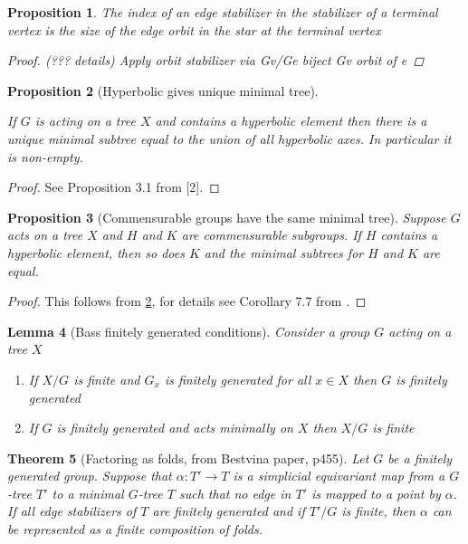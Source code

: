 \documentclass[12pt,parskip=full]{report}
\theoremstyle{plain}
\newtheorem{thm}{Theorem}[section]
\newtheorem{lem}[thm]{Lemma}
\newtheorem{prop}[thm]{Proposition}
\theoremstyle{definition}
\begin{document}
\begin{prop} The index of an edge stabilizer in the stabilizer of a terminal vertex is the size of the edge orbit in the star at the terminal vertex
\begin{proof}
    (??? details) Apply orbit stabilizer via Gv/Ge biject Gv orbit of e
\end{proof}
\end{prop}

\begin{prop}
    [Hyperbolic gives unique minimal tree]
    \label{pro:uniquemintree}
    
    If $G$ is acting on a tree $X$ and contains a hyperbolic element then there is a unique minimal subtree equal to the union of all hyperbolic axes. In particular it is non-empty.
\end{prop}
\begin{proof}
See Proposition 3.1 from [2].
\end{proof}
\begin{prop}
    [Commensurable groups have the same minimal tree]
    \label{pro:commintree}
    Suppose $G$ acts on a tree $X$ and $H$ and $K$ are commensurable subgroups. If $H$ contains a hyperbolic element, then so does $K$ and the minimal subtrees for $H$ and $K$ are equal.
\end{prop}
\begin{proof}
    This follows from \ref{pro:uniquemintree}, for details see Corollary 7.7 from \cite{hymanbass}.
\end{proof}

\begin{lem}
    [Bass finitely generated conditions]
    \label{lem:bassfgcon}
    Consider a group \(G\) acting on a tree \(X\)
    \begin{enumerate}
        \item If \(X/G\) is finite and \(G_x\) is finitely generated for all \(x\in X\) then \(G\) is finitely generated
        \item If \(G\) is finitely generated and acts minimally on \(X\) then \(X/G\) is finite
    \end{enumerate}
\end{lem}


\begin{thm}[Factoring as folds, from Bestvina paper, p455]
    \label{thm:folds} 
    Let $G$ be a finitely generated group. Suppose that $\alpha: T'\to T$ is a simplicial equivariant map from a $G$-tree $T'$ to a minimal $G$-tree $T$ such that no edge in $T'$ is mapped to a point by $\alpha$. If all edge stabilizers of $T$ are finitely generated and if $T'/G$ is finite, then $\alpha$ can be represented as a finite composition of folds.
\end{thm}
\end{document}
